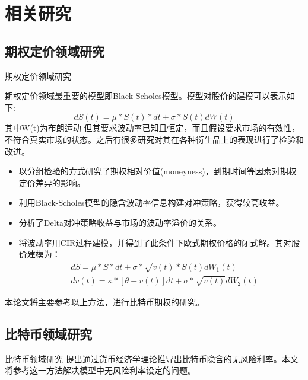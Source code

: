 \documentclass[11pt,dark]{mathbeamer}
\begin{document}
\section{相关研究}
\subsection{期权定价领域研究}
\begin{frame}[allowframebreaks]{期权定价领域研究}
  
  期权定价领域最重要的模型即Black-Scholes模型\cite{Fische-1973}。模型对股价的建模可以表示如下:
  \begin{equation}\label{black}
    dS(t)=\mu*S(t)*dt+\sigma*S(t)dW(t)
  \end{equation}
  其中W(t)为布朗运动\newline
  但其要求波动率已知且恒定，而且假设要求市场的有效性，不符合真实市场的状态。之后有很多研究对其在各种衍生品上的表现进行了检验和改进。
\framebreak
  \begin{itemize}
    \item {}以分组检验的方式研究了期权相对价值(moneyness)，到期时间等因素对期权定价差异的影响。
    \item {}利用Black-Scholes模型的隐含波动率信息构建对冲策略，获得较高收益。
    \item {} 分析了Delta对冲策略收益与市场的波动率溢价的关系。
    \item {} 将波动率用CIR过程建模，并得到了此条件下欧式期权价格的闭式解。其对股价建模为：
    \begin{equation}\label{heston}
      \begin{split}
        &dS=\mu*S*dt+\sigma*{\sqrt{v(t)}}*S(t)dW_{1}(t) \\
        &dv(t)=\kappa*[\theta-v(t)]dt+\sigma*\sqrt{v(t)}dW_{2}(t)
      \end{split}
    \end{equation}
  \end{itemize}
  本论文将主要参考以上方法，进行比特币期权的研究。
\end{frame}

\subsection{比特币领域研究}
\begin{frame}{比特币领域研究}
   提出通过货币经济学理论推导出比特币隐含的无风险利率。本文将参考这一方法解决模型中无风险利率设定的问题。
\end{frame}
\end{document}
